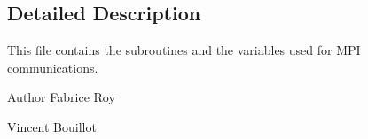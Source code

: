 \subsection{Detailed Description}
This file contains the subroutines and the variables used for M\+PI communications. 

\begin{DoxyAuthor}{Author}
Fabrice Roy 

Vincent Bouillot 
\end{DoxyAuthor}

